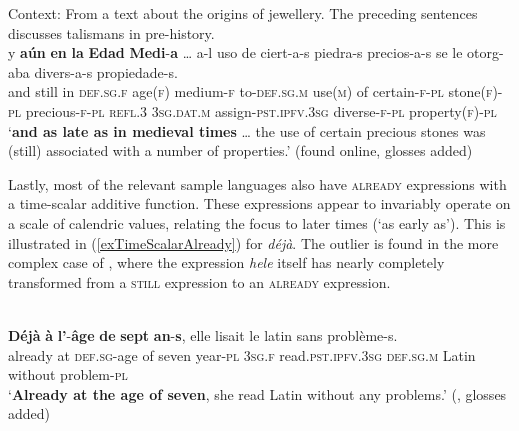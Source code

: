 \begin{exe}
	\ex Context: From a text about the origins of jewellery. The preceding sentences discusses talismans in pre-history\label{exTimeScalarSpanishAun1}.\\
	\gll y \textbf{aún} \textbf{en} \textbf{la} \textbf{Edad} \textbf{Medi}-\textbf{a} … a-l uso de ciert-a-s piedra-s precios-a-s se le otorg-aba divers-a-s propiedade-s.\\
	and still in \textsc{def}.\textsc{sg}.\textsc{f} age(\textsc{f}) medium-\textsc{f} {} to-\textsc{def}.\textsc{sg}.\textsc{m} use(\textsc{m}) of certain-\textsc{f}-\textsc{pl} stone(\textsc{f})-\textsc{pl} precious-\textsc{f}-\textsc{pl} \textsc{refl}.3 3\textsc{sg}.\textsc{dat}.\textsc{m} assign-\textsc{pst}.\textsc{ipfv}.3\textsc{sg} diverse-\textsc{f}-\textsc{pl} property(\textsc{f})-\textsc{pl}\\
	\glt \lq \textbf{and as late as in medieval times} … the use of certain precious stones was (still) associated with a number of properties.\rq{} (found online, glosses added)%
\end{exe}

Lastly, most of the relevant sample languages also have \textsc{already} expressions with a time-scalar additive function. These expressions appear to invariably operate on a scale of calendric values, relating the focus to later times (\lq as early as'). This is illustrated in (\ref{exTimeScalarAlready}) for  \textit{déjà}. The outlier is found in the more complex case of , where the expression \textit{hele} itself has nearly completely transformed from a \textsc{still} expression to an \textsc{already} expression.

\begin{exe}
	\ex {}\label{exTimeScalarAlready}\\
	\gll \textbf{Déjà} \textbf{à} \textbf{l’}-\textbf{âge} \textbf{de} \textbf{sept} \textbf{an}-\textbf{s}, elle lisait le latin sans problème-s.\\
	already at \textsc{def}.\textsc{sg}-age of seven year-\textsc{pl} 3\textsc{sg}.\textsc{f} read.\textsc{pst}.\textsc{ipfv}.3\textsc{sg} \textsc{def}.\textsc{sg}.\textsc{m} Latin without problem-\textsc{pl}\\
	\glt \lq \textbf{Already at the age of seven}, she read Latin without any problems.' (\cite[162]{MosegaardHansen2008},  glosses added)
\end{exe}

